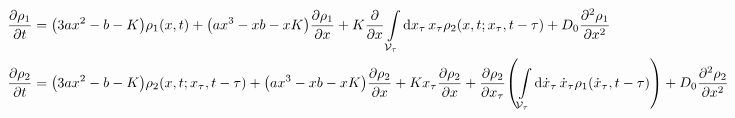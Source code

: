 \documentclass[a4paper,10pt]{article}
\newcommand{\intl}{\int\limits}
\begin{document}
\begin{align}
	\pdv{\rho_1}{t}
	&=
	\pqty{3ax^2-b-K}
	\rho_1
	(x,t)
	+
	\pqty{ax^3-xb-xK}
	\pdv{\rho_1}{x}
	+
	K
	\pdv{x}
	\intl_{\mathcal{V}_\tau}
	\dd{x_\tau}
	x_\tau
	\rho_2
	(x,t;x_\tau,t-\tau)	
	+
	D_0
	\pdv[2]{\rho_1}{x}
\\
	\pdv{\rho_2}{t}
	&=
	\pqty{3ax^2-b-K}
	\rho_2
	(x,t;x_\tau,t-\tau)
	+
	\pqty{ax^3-xb-xK}
	\pdv{\rho_2}{x}
	+
	Kx_\tau
	\pdv{\rho_2}{x}
	+
	\pdv{\rho_2}{x_\tau}
	\pqty{
		\intl_{\mathcal{V}_\tau}
		\dd{\dot{x}_\tau}
		\dot{x}_\tau
		\rho_1
		(\dot{x}_\tau,t-\tau)
	}
	+
	D_0
	\pdv[2]{\rho_2}{x}
\end{align}
\end{document}
